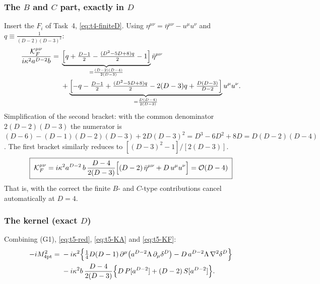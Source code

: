 \subsubsection{The \texorpdfstring{$B$}{B} and \texorpdfstring{$C$}{C} part, exactly in \texorpdfstring{$D$}{D} \texorpdfstring{\tD}{}}
Insert the \(F_i\) of Task~4, \eqref{eq:t4-finiteD}. Using \(\eta^{\mu\nu}=\bar\eta^{\mu\nu}-u^\mu u^\nu\)
and \(q\equiv\frac1{(D-2)(D-3)^2}\):
\begin{equation}\label{eq:t5-KFbr}
\begin{aligned}\frac{\mathcal K^{\mu\nu}_F}{i\kappa^2a^{D-2}b}={}&\underbrace{\Bigl[q+\tfrac{D-1}2-\tfrac{(D^2-5D+8)q}2-1\Bigr]}_{=\frac{(D-2)(D-4)}{2(D-3)}}\bar\eta^{\mu\nu}\\
&+\underbrace{\Bigl[-q-\tfrac{D-1}2+\tfrac{(D^2-5D+8)q}2-2(D-3)q+\tfrac{D(D-3)}{D-2}\Bigr]}_{=\frac{D(D-4)}{2(D-3)}}u^\mu u^\nu .\end{aligned}
\end{equation}
Simplification of the second bracket: with the common denominator \(2(D-2)(D-3)\) the
numerator is \((D-6)-(D-1)(D-2)(D-3)+2D(D-3)^2=D^3-6D^2+8D=D(D-2)(D-4)\). The first bracket
similarly reduces to \([(D-3)^2-1]/[2(D-3)]\).
\begin{equation}\label{eq:t5-KF}
\boxed{\;\mathcal K^{\mu\nu}_F=i\kappa^2a^{D-2}\,b\,\frac{D-4}{2(D-3)}\Bigl[(D-2)\,\bar\eta^{\mu\nu}+D\,u^\mu u^\nu\Bigr]=\mathcal{O}\!\left(D-4\right)\;}
\end{equation}
That is, with the correct  the finite \(B\)- and \(C\)-type contributions cancel
automatically at \(D=4\).

\subsubsection{The kernel (exact \texorpdfstring{$D$}{D})}
Combining (G1), \eqref{eq:t5-red}, \eqref{eq:t5-KA} and \eqref{eq:t5-KF}:
\begin{equation}\label{eq:t5-kernelD}
\begin{aligned}-iM^2_{\rm 4pt}={}&-i\kappa^2\Bigl\{\tfrac14D(D-1)\,\partial^\mu\bigl(a^{D-2}\Lambda\,\partial_\mu\delta^D\bigr)-D\,a^{D-2}\Lambda\,\nabla^2\delta^D\Bigr\}\\
&-i\kappa^2b\,\frac{D-4}{2(D-3)}\Bigl\{D\,P[a^{D-2}]+(D-2)\,S[a^{D-2}]\Bigr\}.\end{aligned}
\end{equation}

